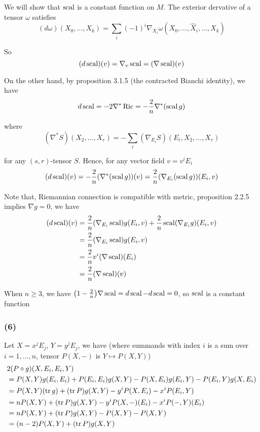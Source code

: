 We will show that $\operatorname{scal}$ is a constant function on $M$. The exterior dervative of a tensor $\omega$ satisfies
$$
(d \omega)(X_0, ..., X_k) = \sum_i (-1)^i \nabla_{X_i} \omega (X_0, ..., \hat{X}_i, ..., X_k)
$$

So
$$
(d \operatorname{scal})(v) = \nabla_v \operatorname{scal} = (\nabla \operatorname{scal})(v)
$$

On the other hand, by proposition 3.1.5 (the contracted Bianchi identity), we have
$$
	d \operatorname{scal} = -2 \nabla^* \operatorname{Ric} = - \frac{2}{n} \nabla^* (\operatorname{scal} g)
$$

where
$$
	(\nabla^* S)(X_2, ..., X_r) = - \sum_i (\nabla_{E_i} S)(E_i, X_2, ..., X_r)
$$

for any $(s, r)$-tensor $S$. Hence, for any vector field $v = v^i E_i$
$$
	(d \operatorname{scal}) (v) = - \frac{2}{n} (\nabla^* (\operatorname{scal} g))(v) = \frac{2}{n} (\nabla_{E_i} (\operatorname{scal} g))(E_i, v)
$$

Note that, Riemannian connection is compatible with metric, proposition 2.2.5 implies $\nabla g = 0$, we have
\begin{align*}
	(d \operatorname{scal}) (v)
	&= \frac{2}{n}(\nabla_{E_i} \operatorname{scal}) g(E_i, v) + \frac{2}{n} \operatorname{scal} (\nabla_{E_i} g)(E_i, v) \\
	&= \frac{2}{n}(\nabla_{E_i} \operatorname{scal}) g(E_i, v) \\
	&= \frac{2}{n}v^i (\nabla \operatorname{scal})(E_i) \\
	&= \frac{2}{n} (\nabla \operatorname{scal})(v) \\
\end{align*}

When $n \geq 3$, we have $\tuple*{1 - \frac{2}{n}} \nabla \scal = d \scal - d \scal = 0$, so $\operatorname{scal}$ is a constant function

\subsubsection{(6)}

Let $X = x^j E_j$, $Y = y^j E_j$, we have (where summands with index $i$ is a sum over $i=1, ..., n$, tensor $P(X, -)$ is $Y \mapsto P(X, Y)$)
\begin{align*}
	&2 (P \circ g)(X, E_i, E_i, Y) \\
	&= P(X, Y) g(E_i, E_i) + P(E_i, E_i) g(X, Y) - P(X, E_i) g(E_i, Y) - P(E_i, Y) g(X, E_i) \\
	&= P(X, Y) (\operatorname{tr} g) + (\operatorname{tr} P) g(X, Y) - y^i P(X, E_i) - x^i P(E_i, Y) \\
	&= n P(X, Y) + (\operatorname{tr} P) g(X, Y) - y^i P(X, -)(E_i) - x^i P(-, Y)(E_i) \\
	&= n P(X, Y) + (\operatorname{tr} P) g(X, Y) - P(X, Y) - P(X, Y) \\
	&= (n - 2) P(X, Y) + (\operatorname{tr} P) g(X, Y)
\end{align*}


